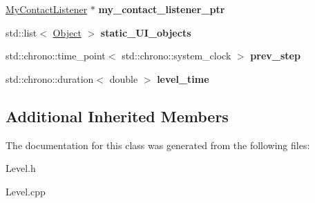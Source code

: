 \begin{DoxyCompactItemize}
\hyperlink{class_my_contact_listener}{My\+Contact\+Listener} $\ast$ {\bfseries my\+\_\+contact\+\_\+listener\+\_\+ptr}
\item 
\mbox{\label{class_level_a89802def1a1b4e8768806a41d972c32c}} 
std\+::list$<$ \hyperlink{class_object}{Object} $>$ {\bfseries static\+\_\+\+U\+I\+\_\+objects}
\item 
\mbox{\label{class_level_a456b63f58afc3c2a0ae917e955ca80df}} 
std\+::chrono\+::time\+\_\+point$<$ std\+::chrono\+::system\+\_\+clock $>$ {\bfseries prev\+\_\+step}
\item 
\mbox{\label{class_level_a2c22c40ee8972da9630a327d93db30ed}} 
std\+::chrono\+::duration$<$ double $>$ {\bfseries level\+\_\+time}
\end{DoxyCompactItemize}
\subsection*{Additional Inherited Members}


The documentation for this class was generated from the following files\+:\begin{DoxyCompactItemize}
\item 
Level.\+h\item 
Level.\+cpp\end{DoxyCompactItemize}
